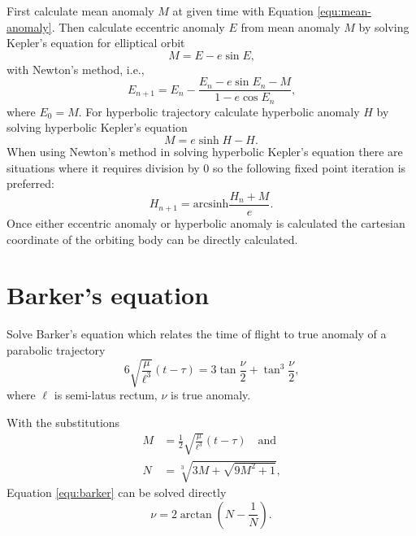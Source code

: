 \documentclass{article}
\begin{document}
First calculate mean anomaly $M$ at given time with Equation \ref{equ:mean-anomaly}.
Then calculate eccentric anomaly $E$ from mean anomaly $M$ by solving Kepler's equation
for elliptical orbit
\begin{equation}
  M = E - e \sin E\text{,}
\end{equation}
with Newton's method, i.e.,
\begin{equation}
  E_{n+1} = E_n - \frac{E_n - e \sin E_n - M}{1 - e \cos E_n}\text{,}
\end{equation}
where $E_0 = M$.
For hyperbolic trajectory calculate hyperbolic anomaly $H$ by solving hyperbolic
Kepler's equation
\begin{equation}
  M = e \sinh H - H\text{.}
\end{equation}
When using Newton's method in solving hyperbolic Kepler's equation there are
situations where it requires division by $0$ so the following fixed point iteration
is preferred:
\begin{equation}
  H_{n+1} = \mathrm{arcsinh}\frac{H_{n} + M}{e}\text{.}
\end{equation}
Once either eccentric anomaly or hyperbolic anomaly is calculated the cartesian
coordinate of the orbiting body can be directly calculated.

\section{Barker's equation}
Solve Barker's equation which relates the time of flight to true anomaly of a parabolic trajectory
\begin{equation}
  6 \sqrt{\frac{\mu}{\ell^3}}(t - \tau) = 3 \tan\frac{\nu}{2} + \tan^3\frac{\nu}{2}\text{,}
  \label{equ:barker}
\end{equation}
where $\ell$ is semi-latus rectum, $\nu$ is true anomaly.

With the substitutions
\begin{align}
  M &= \frac{1}{2}\sqrt{\frac{\mu}{\ell^3}}(t - \tau)\quad\text{and} \\
  N &= \sqrt[3]{3 M + \sqrt{9 M^2 + 1}}\text{,}
\end{align}
Equation \ref{equ:barker} can be solved directly
\begin{equation}
  \nu = 2 \arctan\left(N - \frac{1}{N}\right)\text{.}
\end{equation}
\end{document}
